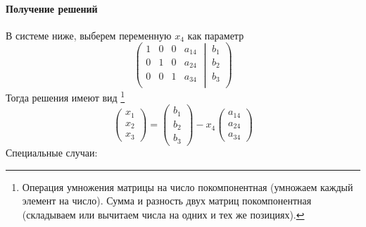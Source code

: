 \paragraph{Получение решений}
В системе ниже, выберем переменную $x_4$ как параметр
\[
\left(\left.
\begin{matrix}
1& 0&0& a_{14}\\
0& 1&0& a_{24}\\
0& 0&1& a_{34}\\
\end{matrix}
\:\right|\:
\begin{matrix}
b_1\\
b_2\\
b_3\\
\end{matrix}
\right)
\]
Тогда решения имеют вид%
\footnote{Операция умножения матрицы на число покомпонентная (умножаем каждый элемент на число).
Сумма и разность двух матриц покомпонентная (складываем или вычитаем числа на одних и тех же позициях).}
\[
\begin{pmatrix}
x_1\\
x_2\\
x_3
\end{pmatrix}
=
\begin{pmatrix}
b_1\\
b_2\\
b_3
\end{pmatrix}
-
x_4
\begin{pmatrix}
a_{14}\\
a_{24}\\
a_{34}
\end{pmatrix}
\]
Специальные случаи:
